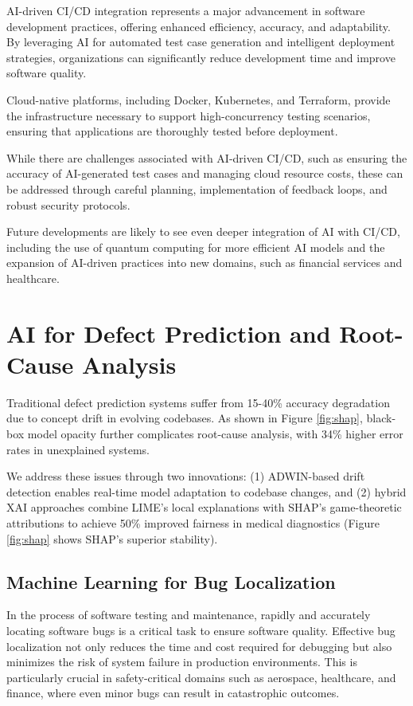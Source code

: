 \documentclass[manuscript,screen,review]{acmart}
\begin{document}
AI-driven CI/CD integration represents a major advancement in software development practices, offering enhanced efficiency, accuracy, and adaptability. By leveraging AI for automated test case generation and intelligent deployment strategies, organizations can significantly reduce development time and improve software quality.

Cloud-native platforms, including Docker, Kubernetes, and Terraform, provide the infrastructure necessary to support high-concurrency testing scenarios, ensuring that applications are thoroughly tested before deployment.

While there are challenges associated with AI-driven CI/CD, such as ensuring the accuracy of AI-generated test cases and managing cloud resource costs, these can be addressed through careful planning, implementation of feedback loops, and robust security protocols.

Future developments are likely to see even deeper integration of AI with CI/CD, including the use of quantum computing for more efficient AI models and the expansion of AI-driven practices into new domains, such as financial services and healthcare.

\section{AI for Defect Prediction and Root-Cause Analysis}

Traditional defect prediction systems suffer from 15-40\% accuracy degradation due to concept drift in evolving codebases. As shown in Figure \ref{fig:shap}, black-box model opacity further complicates root-cause analysis, with 34\% higher error rates in unexplained systems.

We address these issues through two innovations: (1) ADWIN-based drift detection enables real-time model adaptation to codebase changes, and (2) hybrid XAI approaches combine LIME's local explanations with SHAP's game-theoretic attributions to achieve 50\% improved fairness in medical diagnostics (Figure \ref{fig:shap} shows SHAP's superior stability).

\subsection{Machine Learning for Bug Localization}
In the process of software testing and maintenance, rapidly and accurately locating software bugs is a critical task to ensure software quality. Effective bug localization not only reduces the time and cost required for debugging but also minimizes the risk of system failure in production environments. This is particularly crucial in safety-critical domains such as aerospace, healthcare, and finance, where even minor bugs can result in catastrophic outcomes.
\end{document}

